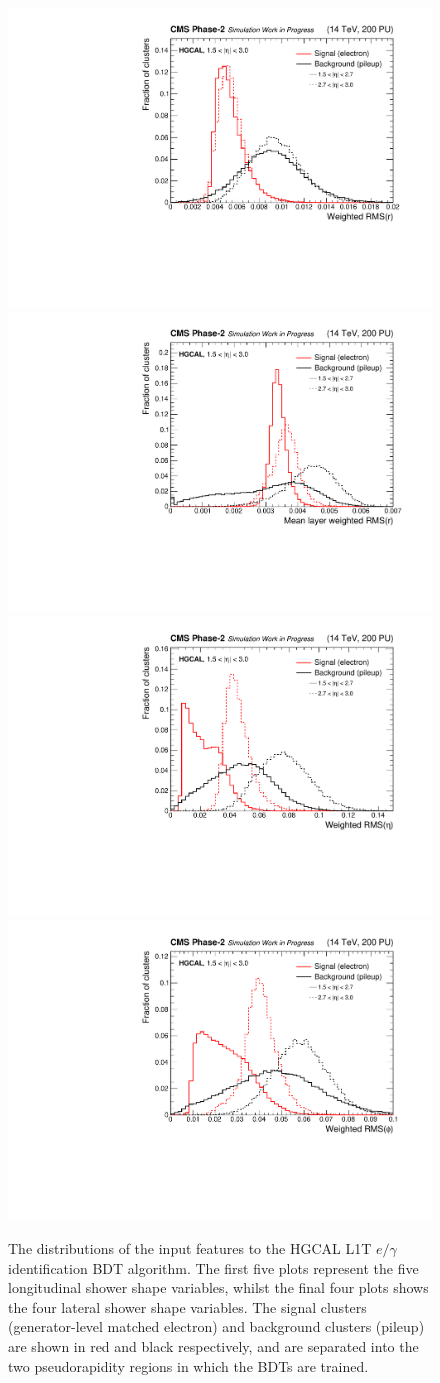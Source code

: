 \begin{figure}
  \includegraphics[width=.32\textwidth]{Figures/cms/egid/cl3d_srrtot.pdf}
  \includegraphics[width=.32\textwidth]{Figures/cms/egid/cl3d_srrmean.pdf}
  \includegraphics[width=.32\textwidth]{Figures/cms/egid/cl3d_seetot.pdf}
  \includegraphics[width=.32\textwidth]{Figures/cms/egid/cl3d_spptot.pdf}
  \caption[$e/\gamma$ identification input feature distributions]
  {
    The distributions of the input features to the HGCAL L1T $e/\gamma$ identification BDT algorithm. The first five plots represent the five longitudinal shower shape variables, whilst the final four plots shows the four lateral shower shape variables. The signal clusters (generator-level matched electron) and background clusters (pileup) are shown in red and black respectively, and are separated into the two pseudorapidity regions in which the BDTs are trained.
  }
  \label{fig:egid_all_features}
\end{figure}